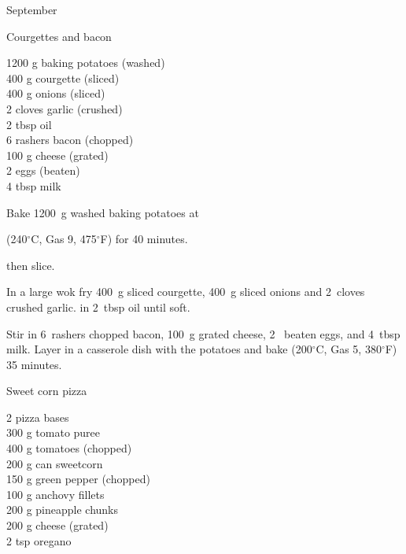 \begin{menu}{September}
\begin{recipe}{2}{Courgettes and bacon}
		\begin{ingredients}
		1200 g baking potatoes (washed) \\
	400 g courgette (sliced) \\
	400 g onions (sliced) \\
	2 cloves garlic (crushed) \\
	2 tbsp oil  \\
	6 rashers bacon (chopped) \\
	100 g cheese (grated) \\
	2  eggs (beaten) \\
	4 tbsp milk  \\
	
		\end{ingredients}
	
    \begin{instructions}
    \item 
      Bake 1200~g washed baking potatoes
      at
      
      (240$^{\circ}$C, Gas 9, 475$^{\circ}$F)
     for 40 minutes.
    
        then slice.
      \item 
        In a large wok fry
        400~g sliced courgette,
        400~g sliced onions
        and
        2~cloves crushed garlic.
        in
        2~tbsp  oil
        until soft.
      \item 
        Stir in
        6~rashers chopped bacon,
        100~g grated cheese,
        2~ beaten eggs,
        and
        4~tbsp  milk.
        Layer in a casserole dish
        with the potatoes
        and bake 
      (200$^{\circ}$C, Gas 5, 380$^{\circ}$F)
     35 minutes.
      
    \end{instructions}
    \end{recipe}%
  
    \begin{recipe}{2}{Sweet corn pizza}%
    
		\begin{ingredients}
		2  pizza bases  \\
	300 g tomato puree  \\
	400 g tomatoes (chopped) \\
	200 g can sweetcorn  \\
	150 g green pepper (chopped) \\
	100 g anchovy fillets  \\
	200 g pineapple chunks  \\
	200 g cheese (grated) \\
	2 tsp oregano  \\
	

\end{ingredients}
\end{recipe}
\end{menu}
